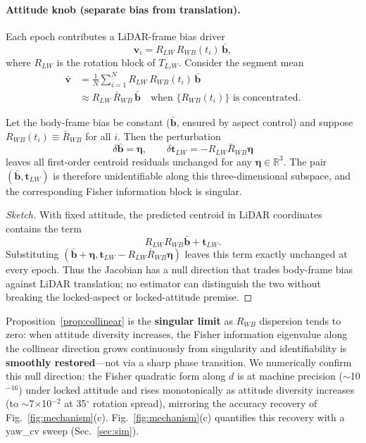 \paragraph{Attitude knob (separate bias from translation).}
Each epoch contributes a LiDAR-frame bias driver
\begin{equation}
  \mathbf{v}_i = R_{LW}\,R_{WB}(t_i)\,\bar{\mathbf{b}},
  \label{eq:frame_bias}
\end{equation}
where $R_{LW}$ is the rotation block of $T_{L_\ell W}$.
Consider the segment mean
\begin{equation}
\begin{split}
  \bar{\mathbf{v}}
  &= \frac{1}{N}\sum_{i=1}^{N} R_{LW}\,R_{WB}(t_i)\,\bar{\mathbf{b}} \\
  &\approx R_{LW}\,\bar{R}_{WB}\,\bar{\mathbf{b}}
  \quad\text{when }\{R_{WB}(t_i)\}\text{ is concentrated.}
\end{split}
  \label{eq:mean_v_concentrated}
\end{equation}

\begin{proposition}
\label{prop:collinear}
Let the body-frame bias be constant ($\bar{\mathbf{b}}$, ensured by aspect control)
and suppose $R_{WB}(t_i)\equiv\bar{R}_{WB}$ for all $i$.
Then the perturbation
\[
  \delta\bar{\mathbf{b}}=\boldsymbol{\eta},\qquad
  \delta\mathbf{t}_{LW}=-R_{LW}\bar{R}_{WB}\boldsymbol{\eta}
\]
leaves all first-order centroid residuals unchanged for any
$\boldsymbol{\eta}\in\mathbb{R}^3$.
The pair $(\bar{\mathbf{b}},\mathbf{t}_{LW})$ is therefore unidentifiable along this
three-dimensional subspace, and the corresponding Fisher information block is
singular.
\end{proposition}

\begin{proof}[Sketch]
With fixed attitude, the predicted centroid in LiDAR coordinates contains the term
\[
  R_{LW}R_{WB}\bar{\mathbf{b}}+\mathbf{t}_{LW}.
\]
Substituting $(\bar{\mathbf{b}}+\boldsymbol{\eta},
\mathbf{t}_{LW}-R_{LW}\bar{R}_{WB}\boldsymbol{\eta})$ leaves this term exactly
unchanged at every epoch.
Thus the Jacobian has a null direction that trades body-frame bias against LiDAR
translation; no estimator can distinguish the two without breaking the locked-aspect
or locked-attitude premise.
\end{proof}

Proposition~\ref{prop:collinear} is the \textbf{singular limit} as $R_{WB}$
dispersion tends to zero: when attitude diversity increases, the Fisher information
eigenvalue along the collinear direction grows continuously from singularity and
identifiability is \textbf{smoothly restored}---not via a sharp phase transition.
We numerically confirm this null direction: the Fisher quadratic form along $d$ is
at machine precision ($\sim$10$^{-16}$) under locked attitude and rises monotonically
as attitude diversity increases (to $\sim$7$\times$10$^{-2}$ at 35$^\circ$ rotation
spread), mirroring the accuracy recovery of Fig.~\ref{fig:mechanism}(c).
Fig.~\ref{fig:mechanism}(c) quantifies this recovery with a yaw\_cv sweep
(Sec.~\ref{sec:sim}).

